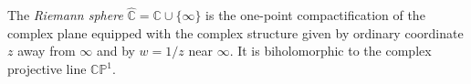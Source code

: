 
The \emph{Riemann sphere} $\widehat{\mathbb C}=\mathbb C\cup\{\infty\}$ is the one-point compactification of the complex plane equipped with the complex structure given by ordinary coordinate $z$ away from $\infty$ and by $w=1/z$ near $\infty$. It is biholomorphic to the complex projective line $\mathbb{CP}^1$.
